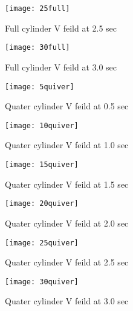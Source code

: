 \documentclass[12pt]{article}
\begin{document}
\begin{figure}
\centering
\begin{minipage}{.5\textwidth}
  \centering
  \texttt{[image: 25full]}
  \captionsetup{width=0.8\textwidth}
  \caption{Full cylinder V feild at 2.5 sec} 
\end{minipage}%
\begin{minipage}{.5\textwidth}
  \centering
  \texttt{[image: 30full]}
  \captionsetup{width=0.8\textwidth}
  \caption{Full cylinder V feild at 3.0 sec} 
\end{minipage}
\end{figure}


\begin{figure}
\centering
\begin{minipage}{.5\textwidth}
  \centering
  \texttt{[image: 5quiver]}
  \captionsetup{width=0.8\textwidth}
  \caption{Quater cylinder V feild at 0.5 sec} 
\end{minipage}%
\begin{minipage}{.5\textwidth}
  \centering
  \texttt{[image: 10quiver]}
  \captionsetup{width=0.8\textwidth}
  \caption{Quater cylinder V feild at 1.0 sec} 
\end{minipage}
\end{figure}

\begin{figure}
\centering
\begin{minipage}{.5\textwidth}
  \centering
  \texttt{[image: 15quiver]}
  \captionsetup{width=0.8\textwidth}
  \caption{Quater cylinder V feild at 1.5 sec} 
\end{minipage}%
\begin{minipage}{.5\textwidth}
  \centering
  \texttt{[image: 20quiver]}
  \captionsetup{width=0.8\textwidth}
  \caption{Quater cylinder V feild at 2.0 sec} 
\end{minipage}
\end{figure}

\begin{figure}
\centering
\begin{minipage}{.5\textwidth}
  \centering
  \texttt{[image: 25quiver]}
  \captionsetup{width=0.8\textwidth}
  \caption{Quater cylinder V feild at 2.5 sec} 
\end{minipage}%
\begin{minipage}{.5\textwidth}
  \centering
  \texttt{[image: 30quiver]}
  \captionsetup{width=0.8\textwidth}
  \caption{Quater cylinder V feild at 3.0 sec} 
\end{minipage}
\end{figure}
\end{document}
